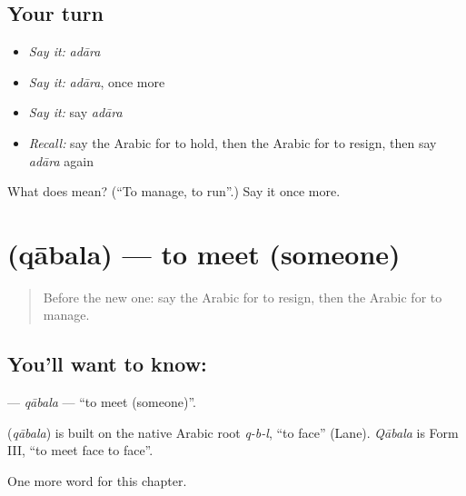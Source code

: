 \subsection*{Your turn}
\begin{itemize}
\raggedright
  \item \emph{Say it:} \emph{adāra}
  \item \emph{Say it:} \emph{adāra}, once more
  \item \emph{Say it:} say \emph{adāra}
  \item \emph{Recall:} say the Arabic for to hold, then the Arabic for to resign, then say \emph{adāra} again
\end{itemize}

\begin{tcolorbox}[breakable,colback=teal!4,colframe=teal!35!black,title={Before you move on}]
What does  mean? (\textquotedblleft{}To manage, to run\textquotedblright{}.) Say it once more.
\end{tcolorbox}
\section[\texorpdfstring{\ar{قابل} (qābala)}{قابل (qābala)}]{ (qābala) — to meet (someone)}

\label{lesson:AR-C195-qabala}



\begin{quote}
Before the new one: say the Arabic for to resign, then the Arabic for to manage.
\end{quote}

\subsection*{You'll want to know: }
\textbf{} — \emph{qābala} — \textquotedblleft{}to meet (someone)\textquotedblright{}.

\begin{cousinweb}
\textbf{} (\emph{qābala}) is built on the native Arabic root \emph{q-b-l}, \textquotedblleft{}to face\textquotedblright{} (Lane). \emph{Qābala} is Form III, \textquotedblleft{}to meet face to face\textquotedblright{}.
\end{cousinweb}

\begin{grammarlens}[title={What you've built}]
One more word for this chapter.
\end{grammarlens}

